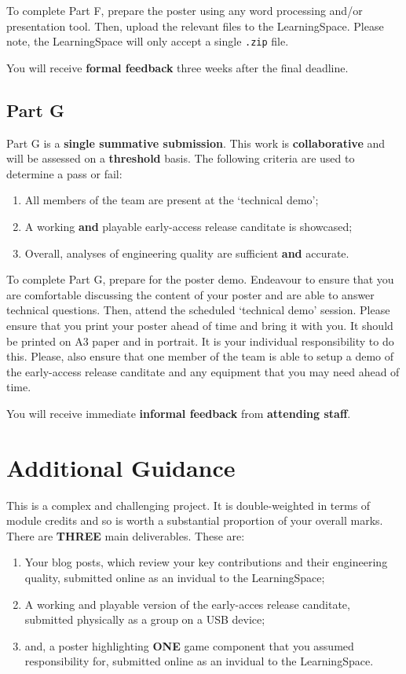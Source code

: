 \documentclass{../../fal_assignment}
\begin{document}
To complete Part F, prepare the poster using any word processing and/or presentation tool. Then, upload the relevant files to the LearningSpace. Please note, the LearningSpace will only accept a single \texttt{.zip} file.

You will receive \textbf{formal feedback} three weeks after the final deadline.

\subsection*{Part G}

Part G is a \textbf{single summative submission}. This work is \textbf{collaborative} and will be assessed on a \textbf{threshold} basis. The following criteria are used to determine a pass or fail:

\begin{enumerate}[label=(\alph*)]
	\item All members of the team are present at the `technical demo';
		\item A working \textbf{and} playable early-access release canditate is showcased;
	\item Overall, analyses of engineering quality are sufficient \textbf{and} accurate.
\end{enumerate}

To complete Part G, prepare for the poster demo. Endeavour to ensure that you are comfortable discussing the content of your poster and are able to answer technical questions. Then, attend the scheduled `technical demo' session. Please ensure that you print your poster ahead of time and bring it with you. It should be printed on A3 paper and in portrait. It is your individual responsibility to do this. Please, also ensure that one member of the team is able to setup a demo of the early-access release canditate and any  equipment that you may need ahead of time.

You will receive immediate \textbf{informal feedback} from \textbf{attending staff}.

\section*{Additional Guidance}

This is a complex and challenging project. It is double-weighted in terms of module credits and so is worth a substantial proportion of your overall marks. There are \textbf{THREE} main deliverables. These are:

\begin{enumerate}[label=(\roman*)]
	\item Your blog posts, which review your key contributions and their engineering quality, submitted online as an invidual to the LearningSpace;
		\item A working and playable version of the early-acces release canditate, submitted physically as a group on a USB device;
	\item and, a poster highlighting \textbf{ONE} game component that you assumed responsibility for, submitted online as an invidual to the LearningSpace.
\end{enumerate}
\end{document}
